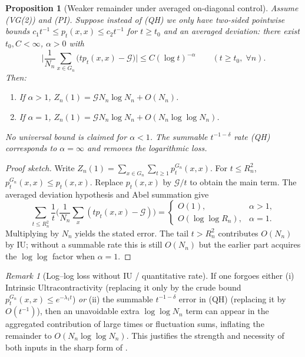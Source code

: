 \documentclass{article}
\numberwithin{equation}{section}
\newtheorem{proposition}[theorem]{Proposition}
\theoremstyle{definition}
\theoremstyle{remark}
\newtheorem{remark}[theorem]{Remark}
\newcommand{\cG}{\mathcal{G}}
\begin{document}
\begin{proposition}[Weaker remainder under averaged on-diagonal control]\label{prop:weaker_remainder}
Assume (VG(2)) and (PI). Suppose instead of (QH) we only have two-sided pointwise bounds $c_1 t^{-1}\le p_t(x,x)\le c_2 t^{-1}$ for $t\ge t_0$ and an averaged deviation: there exist $t_0,C<\infty$, $\alpha>0$ with
\[
  \Big| \frac{1}{N_n} \sum_{x\in G_n} \Big( t p_t(x,x) - \cG \Big) \Big| \le C (\log t)^{-\alpha}\qquad(t\ge t_0,\;\forall n).
\]
Then:
\begin{enumerate}
  \item If $\alpha>1$, $Z_n(1)=\cG N_n \log N_n + O(N_n)$.
  \item If $\alpha=1$, $Z_n(1)=\cG N_n \log N_n + O(N_n \log\log N_n)$.
\end{enumerate}
No universal bound is claimed for $\alpha<1$. The summable $t^{-1-\delta}$ rate (QH) corresponds to $\alpha=\infty$ and removes the logarithmic loss.
\end{proposition}
\begin{proof}[Proof sketch]
Write $Z_n(1)=\sum_{x\in G_n}\sum_{t\ge1} p_t^{G_n}(x,x)$. For $t\le R_n^2$, $p_t^{G_n}(x,x)\le p_t(x,x)$. Replace $p_t(x,x)$ by $\cG/t$ to obtain the main term. The averaged deviation hypothesis and Abel summation give
\[
\sum_{t\le R_n^2} \frac{1}{t} \Big( \frac{1}{N_n}\sum_{x} (t p_t(x,x)-\cG) \Big)=
\begin{cases}O(1), & \alpha>1,\\ O(\log\log R_n), & \alpha=1.\end{cases}
\]
Multiplying by $N_n$ yields the stated error. The tail $t>R_n^2$ contributes $O(N_n)$ by IU; without a summable rate this is still $O(N_n)$ but the earlier part acquires the $\log\log$ factor when $\alpha=1$.\end{proof}

\begin{remark}[Log--log loss without IU / quantitative rate]\label{rem:loglog}
If one forgoes either (i) Intrinsic Ultracontractivity (replacing it only by the crude bound $p_t^{G_n}(x,x)\le e^{-\lambda_1 t}$) \emph{or} (ii) the summable $t^{-1-\delta}$ error in (QH) (replacing it by $O(t^{-1})$), then an unavoidable extra $\log\log N_n$ term can appear in the aggregated contribution of large times or fluctuation sums, inflating the remainder to $O(N_n \log\log N_n)$. This justifies the strength and necessity of both inputs in the sharp form of .
\end{remark}
\end{document}

